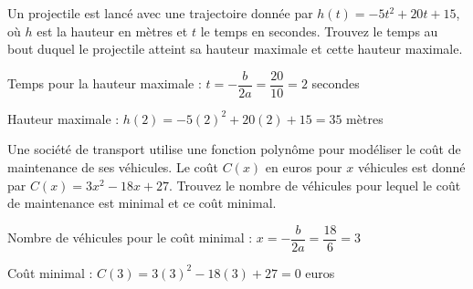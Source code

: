 \documentclass[11pt,a4paper]{article}  %
\begin{document}
\exercice{}

Un projectile est lancé avec une trajectoire donnée par \( h(t) = -5t^2 + 20t + 15 \), où \( h \) est la hauteur en mètres et \( t \) le temps en secondes. Trouvez le temps au bout duquel le projectile atteint sa hauteur maximale et cette hauteur maximale.

\begin{corrBox}
	\begin{itemMet}
		\item Temps pour la hauteur maximale : $t = -\dfrac{b}{2a} = \dfrac{20}{10} = 2$ secondes
		\item Hauteur maximale : $h(2) = -5(2)^2 + 20(2) + 15 = 35$ mètres
	\end{itemMet}	
\end{corrBox}


Une société de transport utilise une fonction polynôme pour modéliser le coût de maintenance de ses véhicules. Le coût \( C(x) \) en euros pour \( x \) véhicules est donné par \( C(x) = 3x^2 - 18x + 27 \). Trouvez le nombre de véhicules pour lequel le coût de maintenance est minimal et ce coût minimal.
\begin{corrBox}
	\begin{itemMet}
		\item Nombre de véhicules pour le coût minimal : $x = -\dfrac{b}{2a} = \dfrac{18}{6} = 3$
		\item Coût minimal : $C(3) = 3(3)^2 - 18(3) + 27 = 0$ euros
	\end{itemMet}	
\end{corrBox}
\end{document}
